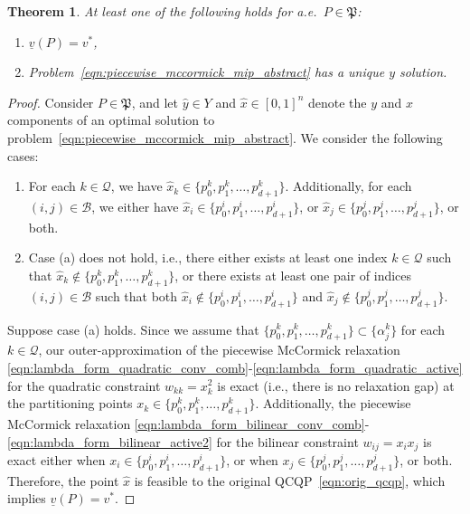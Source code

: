 \documentclass{article}
\newtheorem{theorem}{Theorem}[]
\begin{document}
\begin{theorem}
At least one of the following holds for a.e.\ $P \in \mathfrak{P}$:
\begin{enumerate}
\item $\underline{v}(P) = v^*$,

\item Problem~\eqref{eqn:piecewise_mccormick_mip_abstract} has a unique $y$ solution.
\end{enumerate}
\end{theorem}
\begin{proof}
Consider $P \in \mathfrak{P}$, and let $\hat{y} \in Y$ and $\hat{x} \in [0,1]^n$ denote the $y$ and $x$ components of an optimal solution to problem~\eqref{eqn:piecewise_mccormick_mip_abstract}.
We consider the following cases:
\begin{enumerate}[label=(\alph*)]
\item For each $k \in \mathcal{Q}$, we have $\hat{x}_k \in \{p^k_0, p^k_1, \dots, p^k_{d+1}\}$. Additionally, for each $(i,j) \in \mathcal{B}$, we either have $\hat{x}_i \in \{p^i_0, p^i_1, \dots, p^i_{d+1}\}$, or $\hat{x}_j \in \{p^j_0, p^j_1, \dots, p^j_{d+1}\}$, or both.

\item Case (a) does not hold, i.e., there either exists at least one index $k \in \mathcal{Q}$ such that $\hat{x}_k \not\in \{p^k_0, p^k_1, \dots, p^k_{d+1}\}$, or there exists at least one pair of indices $(i,j) \in \mathcal{B}$ such that  both $\hat{x}_i \not\in \{p^i_0, p^i_1, \dots, p^i_{d+1}\}$ and $\hat{x}_j \not\in \{p^j_0, p^j_1, \dots, p^j_{d+1}\}$.
\end{enumerate}


Suppose case (a) holds.
Since we assume that $\{p^k_0,p^k_1,\dots,p^k_{d+1}\} \subset \{\alpha^k_j\}$ for each $k \in \mathcal{Q}$, our outer-approximation of the piecewise McCormick relaxation \eqref{eqn:lambda_form_quadratic_conv_comb}-\eqref{eqn:lambda_form_quadratic_active} for the quadratic constraint $w_{kk} = x^2_k$ is exact (i.e., there is no relaxation gap) at the partitioning points $x_k \in \{p^k_0, p^k_1, \dots, p^k_{d+1}\}$.
Additionally, the piecewise McCormick relaxation \eqref{eqn:lambda_form_bilinear_conv_comb}-\eqref{eqn:lambda_form_bilinear_active2} for the bilinear constraint $w_{ij} = x_i x_j$ is exact either when $x_i \in \{p^i_0, p^i_1, \dots, p^i_{d+1}\}$, or when $x_j \in \{p^j_0, p^j_1, \dots, p^j_{d+1}\}$, or both.
Therefore, the point $\hat{x}$ is feasible to the original QCQP~\eqref{eqn:orig_qcqp}, which implies $\underline{v}(P) = v^*$.



\end{proof}
\end{document}
